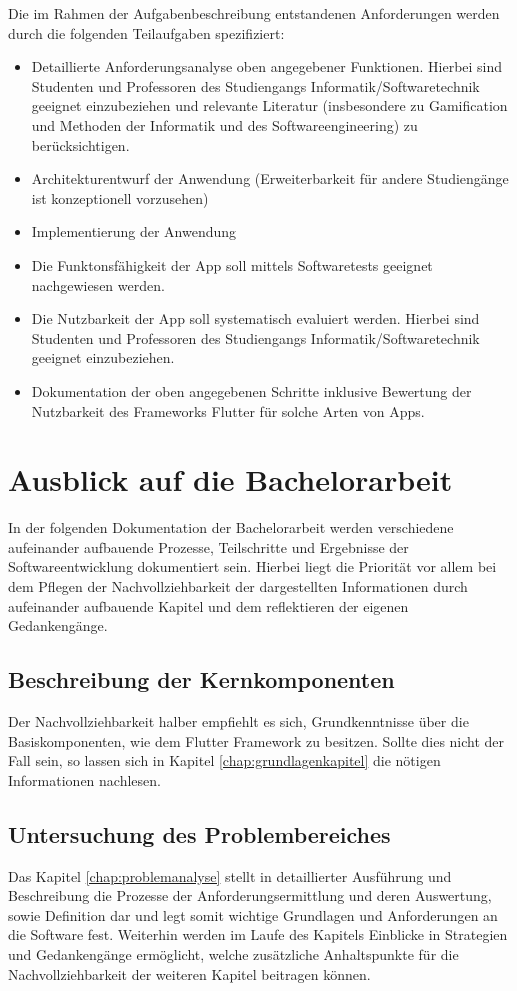 \documentclass[bibliography=totoc,listof=totoc,BCOR=5mm,DIV=12,oneside]{scrbook}
\begin{document}
Die im Rahmen der Aufgabenbeschreibung entstandenen Anforderungen werden durch die folgenden Teilaufgaben spezifiziert:
\begin{itemize}
\item Detaillierte Anforderungsanalyse oben angegebener Funktionen. Hierbei sind Studenten und Professoren des Studiengangs Informatik/Softwaretechnik geeignet einzubeziehen und relevante Literatur (insbesondere zu Gamification und Methoden der Informatik und des Softwareengineering) zu berücksichtigen.
\item Architekturentwurf der Anwendung (Erweiterbarkeit für andere Studiengänge ist konzeptionell vorzusehen)
\item Implementierung der Anwendung
\item Die Funktonsfähigkeit der App soll mittels Softwaretests geeignet nachgewiesen werden.
\item Die Nutzbarkeit der App soll systematisch evaluiert werden. Hierbei sind Studenten und Professoren des Studiengangs Informatik/Softwaretechnik geeignet einzubeziehen.
\item Dokumentation der oben angegebenen Schritte inklusive Bewertung der Nutzbarkeit des Frameworks Flutter für solche Arten von Apps.
\end{itemize}

\section{Ausblick auf die Bachelorarbeit}
\par In der folgenden Dokumentation der Bachelorarbeit werden verschiedene aufeinander aufbauende Prozesse, Teilschritte und Ergebnisse der Softwareentwicklung dokumentiert sein. Hierbei liegt die Priorität vor allem bei dem Pflegen der Nachvollziehbarkeit der dargestellten Informationen durch aufeinander aufbauende Kapitel und dem reflektieren der eigenen Gedankengänge.

\subsection{Beschreibung der Kernkomponenten}
\par Der Nachvollziehbarkeit halber empfiehlt es sich, Grundkenntnisse über die Basiskomponenten, wie dem Flutter Framework zu besitzen. Sollte dies nicht der Fall sein, so lassen sich in Kapitel \ref{chap:grundlagenkapitel} die nötigen Informationen nachlesen.

\subsection{Untersuchung des Problembereiches}
\par Das Kapitel \ref{chap:problemanalyse} stellt in detaillierter Ausführung und Beschreibung die Prozesse der Anforderungsermittlung und deren Auswertung, sowie Definition dar und legt somit wichtige Grundlagen und Anforderungen an die Software fest. Weiterhin werden im Laufe des Kapitels Einblicke in Strategien und Gedankengänge ermöglicht, welche zusätzliche Anhaltspunkte für die Nachvollziehbarkeit der weiteren Kapitel beitragen können.
\end{document}
